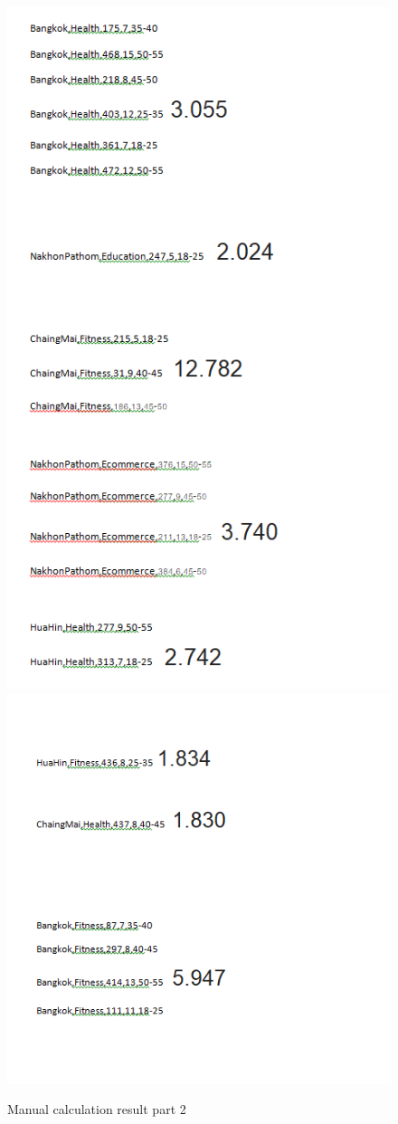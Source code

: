 \documentclass[11pt]{article}
\begin{document}
\begin{figure}[h]
\centering
\includegraphics[scale=0.45]{cal3}
\includegraphics[scale=0.45]{cal4}
\caption{Manual calculation result part 2}
\end{figure}
\end{document}
